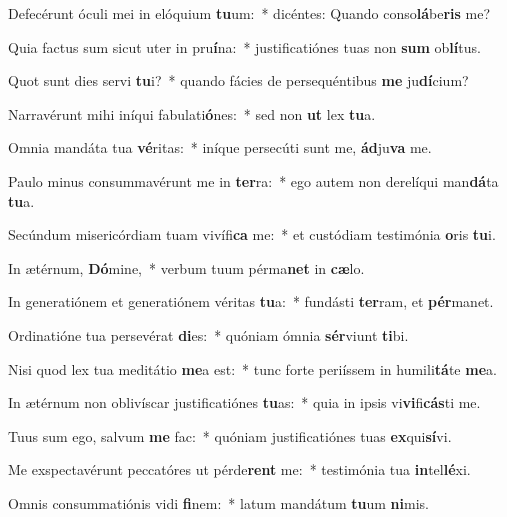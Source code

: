 \item Defecérunt óculi mei in elóquium \textbf{tu}um:~* dicéntes: Quando conso\textbf{lá}be\textbf{ris} me?
\item Quia factus sum sicut uter in pru\textbf{í}na:~* justificatiónes tuas non \textbf{sum} ob\textbf{lí}tus.
\item Quot sunt dies servi \textbf{tu}i?~* quando fácies de persequéntibus \textbf{me} ju\textbf{dí}cium?
\item Narravérunt mihi iníqui fabulati\textbf{ó}nes:~* sed non \textbf{ut} lex \textbf{tu}a.
\item Omnia mandáta tua \textbf{vé}ritas:~* iníque persecúti sunt me, \textbf{ád}ju\textbf{va} me.
\item Paulo minus consummavérunt me in \textbf{ter}ra:~* ego autem non derelíqui man\textbf{dá}ta \textbf{tu}a.
\item Secúndum misericórdiam tuam vivífi\textbf{ca} me:~* et custódiam testimónia \textbf{o}ris \textbf{tu}i.
\item In ætérnum, \textbf{Dó}mine,~* verbum tuum pérma\textbf{net} in \textbf{cæ}lo.
\item In generatiónem et generatiónem véritas \textbf{tu}a:~* fundásti \textbf{ter}ram, et \textbf{pér}manet.
\item Ordinatióne tua persevérat \textbf{di}es:~* quóniam ómnia \textbf{sér}viunt \textbf{ti}bi.
\item Nisi quod lex tua meditátio \textbf{me}a est:~* tunc forte periíssem in humili\textbf{tá}te \textbf{me}a.
\item In ætérnum non oblivíscar justificatiónes \textbf{tu}as:~* quia in ipsis vi\textbf{vi}fi\textbf{cás}ti me.
\item Tuus sum ego, salvum \textbf{me} fac:~* quóniam justificatiónes tuas \textbf{ex}qui\textbf{sí}vi.
\item Me exspectavérunt peccatóres ut pérde\textbf{rent} me:~* testimónia tua \textbf{in}tel\textbf{lé}xi.
\item Omnis consummatiónis vidi \textbf{fi}nem:~* latum mandátum \textbf{tu}um \textbf{ni}mis.
